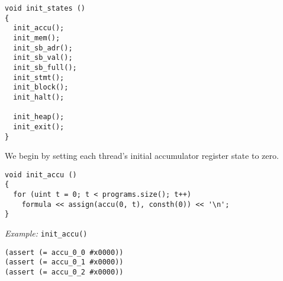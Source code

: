 \begin{lstlisting}[style=c++]
void init_states ()
{
  init_accu();
  init_mem();
  init_sb_adr();
  init_sb_val();
  init_sb_full();
  init_stmt();
  init_block();
  init_halt();

  init_heap();
  init_exit();
}
\end{lstlisting}



\noindent
We begin by setting each thread's initial accumulator register state to zero.

\begin{lstlisting}[style=c++]
void init_accu ()
{
  for (uint t = 0; t < programs.size(); t++)
    formula << assign(accu(0, t), consth(0)) << '\n';
}
\end{lstlisting}

\noindent
\emph{Example:} \lstinline[style=c++]{init_accu()}

\begin{lstlisting}[language=SMTLib]
(assert (= accu_0_0 #x0000))
(assert (= accu_0_1 #x0000))
(assert (= accu_0_2 #x0000))
\end{lstlisting}




